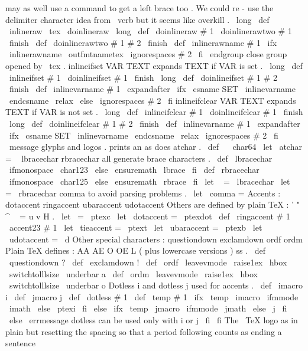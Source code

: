 {{{{may
as
%
well
use
a
command
to
get
a
left
brace
too
.
We
could
re
-
use
the
%
delimiter
character
idea
from
\
verb
but
it
seems
like
overkill
.
%
\
long
\
def
\
inlineraw
{
\
tex
\
doinlineraw
}
\
long
\
def
\
doinlineraw
#
1
{
\
doinlinerawtwo
#
1
\
finish
}
\
def
\
doinlinerawtwo
#
1
#
2
\
finish
{
%
\
def
\
inlinerawname
{
#
1
}
%
\
ifx
\
inlinerawname
\
outfmtnametex
\
ignorespaces
#
2
\
fi
\
endgroup
%
close
group
opened
by
\
tex
.
}
%
inlineifset
{
VAR
TEXT
}
expands
TEXT
if
VAR
is
set
.
%
\
long
\
def
\
inlineifset
#
1
{
\
doinlineifset
#
1
\
finish
}
\
long
\
def
\
doinlineifset
#
1
#
2
\
finish
{
%
\
def
\
inlinevarname
{
#
1
}
%
\
expandafter
\
ifx
\
csname
SET
\
inlinevarname
\
endcsname
\
relax
\
else
\
ignorespaces
#
2
\
fi
}
%
inlineifclear
{
VAR
TEXT
}
expands
TEXT
if
VAR
is
not
set
.
%
\
long
\
def
\
inlineifclear
#
1
{
\
doinlineifclear
#
1
\
finish
}
\
long
\
def
\
doinlineifclear
#
1
#
2
\
finish
{
%
\
def
\
inlinevarname
{
#
1
}
%
\
expandafter
\
ifx
\
csname
SET
\
inlinevarname
\
endcsname
\
relax
\
ignorespaces
#
2
\
fi
}
\
message
{
glyphs
}
%
and
logos
.
%
prints
an
as
does
atchar
{
}
.
\
def
\
{
\
char64
}
\
let
\
atchar
=
\
%
{
}
lbracechar
{
}
rbracechar
{
}
all
generate
brace
characters
.
\
def
\
lbracechar
{
{
\
ifmonospace
\
char123
\
else
\
ensuremath
\
lbrace
\
fi
}
}
\
def
\
rbracechar
{
{
\
ifmonospace
\
char125
\
else
\
ensuremath
\
rbrace
\
fi
}
}
\
let
\
{
=
\
lbracechar
\
let
\
}
=
\
rbracechar
%
comma
{
}
to
avoid
parsing
problems
.
\
let
\
comma
=
%
Accents
:
dotaccent
ringaccent
ubaraccent
udotaccent
%
Others
are
defined
by
plain
TeX
:
'
"
^
~
=
u
v
H
.
\
let
\
=
\
ptexc
\
let
\
dotaccent
=
\
ptexdot
\
def
\
ringaccent
#
1
{
{
\
accent23
#
1
}
}
\
let
\
tieaccent
=
\
ptext
\
let
\
ubaraccent
=
\
ptexb
\
let
\
udotaccent
=
\
d
%
Other
special
characters
:
questiondown
exclamdown
ordf
ordm
%
Plain
TeX
defines
:
AA
AE
O
OE
L
(
plus
lowercase
versions
)
ss
.
\
def
\
questiondown
{
?
}
\
def
\
exclamdown
{
!
}
\
def
\
ordf
{
\
leavevmode
\
raise1ex
\
hbox
{
\
switchtolllsize
\
underbar
{
a
}
}
}
\
def
\
ordm
{
\
leavevmode
\
raise1ex
\
hbox
{
\
switchtolllsize
\
underbar
{
o
}
}
}
%
Dotless
i
and
dotless
j
used
for
accents
.
\
def
\
imacro
{
i
}
\
def
\
jmacro
{
j
}
\
def
\
dotless
#
1
{
%
\
def
\
temp
{
#
1
}
%
\
ifx
\
temp
\
imacro
\
ifmmode
\
imath
\
else
\
ptexi
\
fi
\
else
\
ifx
\
temp
\
jmacro
\
ifmmode
\
jmath
\
else
\
j
\
fi
\
else
\
errmessage
{
dotless
can
be
used
only
with
i
or
j
}
%
\
fi
\
fi
}
%
The
\
TeX
{
}
logo
as
in
plain
but
resetting
the
spacing
so
that
a
%
period
following
counts
as
ending
a
sentence
}}}}
